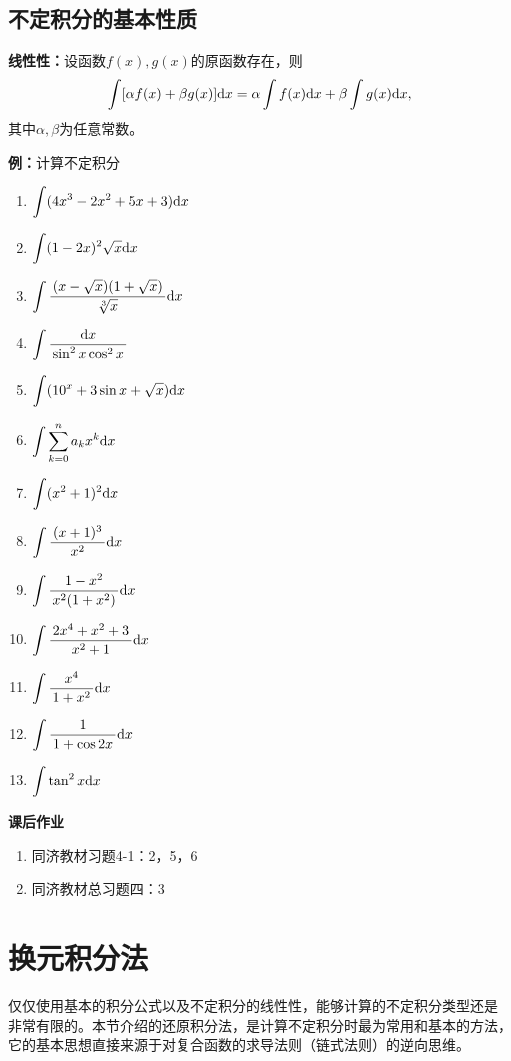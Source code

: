 \subsection{不定积分的基本性质}

\begin{thx}
	{\bf 线性性：}设函数$f(x),g(x)$的原函数存在，则
	$$\int[\alpha f(x)+\beta g(x)]\mathrm{d} x
	=\alpha\int f(x)\mathrm{d} x+\beta\int g(x)\mathrm{d} x,$$
	其中$\alpha,\beta$为任意常数。
\end{thx}

{\bf 例：}计算不定积分
\begin{enumerate}[(1)]
  \setlength{\itemindent}{1cm}
  \item $\displaystyle\int (4x^3-2x^2+5x+3)\mathrm{d} x$
  \item $\displaystyle\int(1-2x)^2\sqrt x\mathrm{d} x$
  \item $\displaystyle\int\displaystyle\frac{\,{(x-\sqrt x)(1+\sqrt x)}\,}{\,{\sqrt[3]x}\,}\mathrm{d} x$
  \item $\displaystyle\int\displaystyle\frac{\,{\mathrm{d} x}\,}{\,{\sin^2x\cos^2x}\,}$
  \item $\displaystyle\int(10^x+3\sin x+\sqrt x)\mathrm{d} x$
  \item $\displaystyle\int\sum\limits_{k=0}^na_kx^k\mathrm{d} x$
  \item $\displaystyle\int (x^2+1)^2\mathrm{d} x$ 
  \item $\displaystyle\int\displaystyle\frac{\,{(x+1)^3}\,}{\,{x^2}\,}\mathrm{d} x$ 
  \item $\displaystyle\int\displaystyle\frac{\,{1-x^2}\,}{\,{x^2(1+x^2)}\,}\mathrm{d} x$
  \item $\displaystyle\int\displaystyle\frac{\,{2x^4+x^2+3}\,}{\,{x^2+1}\,}\mathrm{d} x$
  \item $\displaystyle\int \displaystyle\frac{\,{x^4}\,}{\,{1+x^2}\,}\mathrm{d} x$ 
  \item $\displaystyle\int\displaystyle\frac{\,{1}\,}{\,{1+\cos 2x}\,}\mathrm{d} x$ 
  \item $\displaystyle\int\tan^2 x\mathrm{d} x$
\end{enumerate}

\begin{ext}
	{\bf 课后作业}
	\begin{enumerate}
	  \item 同济教材习题4-1：2，5，6
	  \item 同济教材总习题四：3
	\end{enumerate}
\end{ext}

\section{换元积分法}

仅仅使用基本的积分公式以及不定积分的线性性，能够计算的不定积分类型还是
非常有限的。本节介绍的还原积分法，是计算不定积分时最为常用和基本的方法，
它的基本思想直接来源于对复合函数的求导法则（链式法则）的逆向思维。

